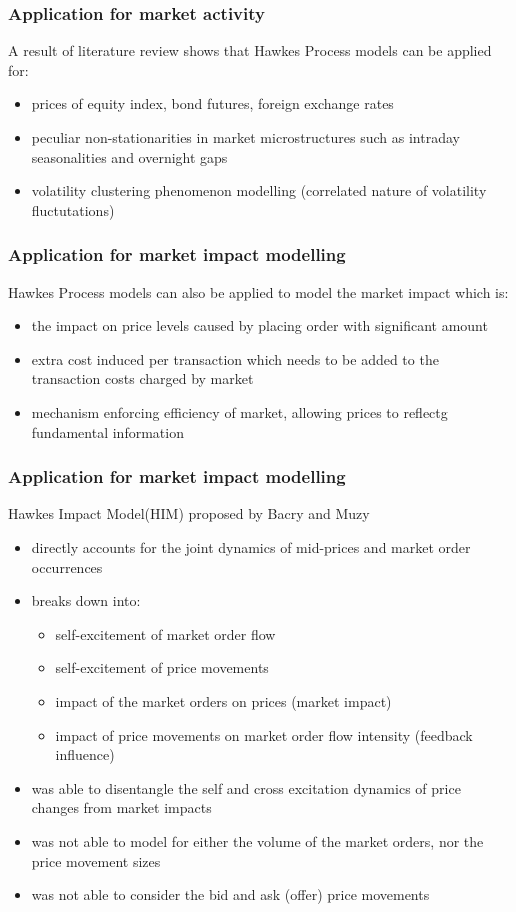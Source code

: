 \documentclass{beamer}
\begin{document}
\begin{frame}
\frametitle{Application for market activity}
A result of literature review shows that Hawkes Process models can be applied for:
\begin{itemize}
	\item prices of equity index, bond futures, foreign exchange rates
	\item peculiar non-stationarities in market microstructures such as intraday seasonalities and overnight gaps
	\item volatility clustering phenomenon modelling (correlated nature of volatility fluctutations)
\end{itemize}
\end{frame}

\begin{frame}
\frametitle{Application for market impact modelling}
Hawkes Process models can also be applied to model the market impact which is:
\begin{itemize}
	\item the impact on price levels caused by placing order with significant amount
	\item extra cost induced per transaction which needs to be added to the transaction costs charged by market
	\item mechanism enforcing efficiency of market, allowing prices to reflectg fundamental information
\end{itemize}
\end{frame}

\begin{frame}
\frametitle{Application for market impact modelling}
Hawkes Impact Model(HIM) proposed by Bacry and Muzy
\begin{itemize}
	\item directly accounts for the joint dynamics of mid-prices and market order occurrences
	\item breaks down into:
	\begin{itemize}
		\item self-excitement of market order flow
		\item self-excitement of price movements
		\item impact of the market orders on prices (market impact)
		\item impact of price movements on market order flow intensity (feedback influence)
	\end{itemize}
	\item was able to disentangle the self and cross excitation dynamics of price changes from market impacts
	\item was not able to model for either the volume of the market orders, nor the price movement sizes
	\item was not able to consider the bid and ask (offer) price movements
\end{itemize}
\end{frame}
\end{document}
